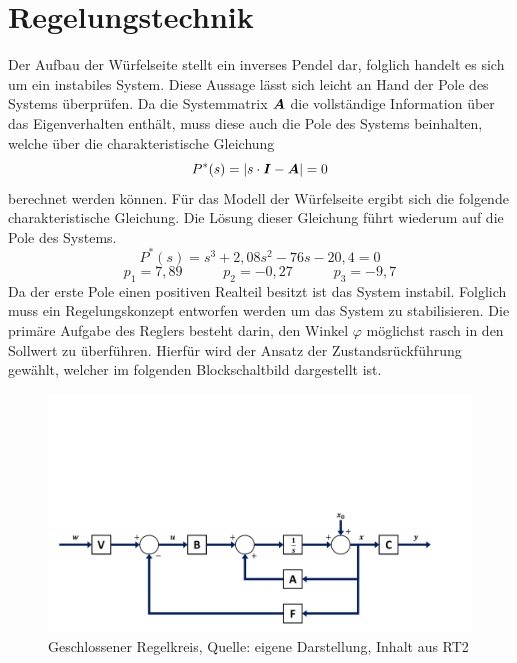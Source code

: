 \section{Regelungstechnik}
Der Aufbau der Würfelseite stellt ein inverses Pendel dar, folglich handelt es sich um ein instabiles System. Diese Aussage lässt sich leicht an Hand der Pole des Systems überprüfen. Da die Systemmatrix $\boldsymbol{A}$ die vollständige Information über das Eigenverhalten enthält, muss diese auch die Pole des Systems beinhalten, welche über die charakteristische Gleichung
\begin{equation}
P^*(s) = |s\cdot \boldsymbol{I} -  \boldsymbol{A}| = 0
\end{equation}
berechnet werden können. Für das Modell der Würfelseite ergibt sich die folgende charakteristische Gleichung. Die Lösung dieser Gleichung führt wiederum auf die Pole des Systems.
\begin{equation}
P^*(s) = s^3+2,08s^2-76s-20,4=0
\end{equation}
\begin{equation}
p_1=7,89 \hspace{35pt} p_2=-0,27 \hspace{35pt} p_3 = -9,7
\end{equation}
Da der erste Pole einen positiven Realteil besitzt ist das System instabil. Folglich muss ein Regelungskonzept entworfen werden um das System zu stabilisieren. Die primäre Aufgabe des Reglers besteht darin, den Winkel $\varphi$ möglichst rasch in den Sollwert zu überführen. Hierfür wird der Ansatz der Zustandsrückführung gewählt, welcher im folgenden Blockschaltbild dargestellt ist.
\begin{figure}[!h]
\centering
\includegraphics[width=\linewidth,trim={0cm 0cm 2cm 9cm}, clip]{4_Regelungstechnik/img/GRK_1}
\caption{Geschlossener Regelkreis, Quelle: eigene Darstellung, Inhalt aus RT2}
\end{figure}
